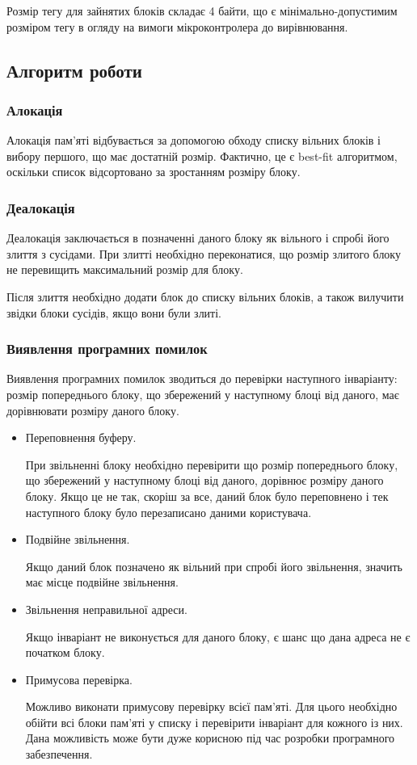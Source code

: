\documentclass[oneside,14pt,a4paper,final]{myextreport}
\begin{document}
Розмір тегу для зайнятих блоків складає 4 байти, що є мінімально-допустимим розміром тегу в огляду на вимоги мікроконтролера до вирівнювання.

\subsection{Алгоритм роботи}

\subsubsection{Алокація}
Алокація пам'яті відбувається за допомогою обходу списку вільних блоків і вибору першого, що має достатній розмір. Фактично, це є best-fit алгоритмом, оскільки список відсортовано за зростанням розміру блоку.

\subsubsection{Деалокація}
Деалокація заключається в позначенні даного блоку як вільного і спробі його злиття з сусідами. При злитті необхідно переконатися, що розмір злитого блоку не перевищить максимальний розмір для блоку.

Після злиття необхідно додати блок до списку вільних блоків, а також вилучити звідки блоки сусідів, якщо вони були злиті.

\subsubsection{Виявлення програмних помилок}
Виявлення програмних помилок зводиться до перевірки наступного інваріанту: розмір попереднього блоку, що збережений у наступному блоці від даного, має дорівнювати розміру даного блоку.

\begin{itemize}
\item Переповнення буферу.

  При звільненні блоку необхідно перевірити що розмір попереднього блоку, що збережений у наступному блоці від даного, дорівнює розміру даного блоку. Якщо це не так, скоріш за все, даний блок було переповнено і тек наступного блоку було перезаписано даними користувача.

\item Подвійне звільнення.

  Якщо даний блок позначено як вільний при спробі його звільнення, значить має місце подвійне звільнення.

\item Звільнення неправильної адреси.

  Якщо інваріант не виконується для даного блоку, є шанс що дана адреса не є початком блоку.

\item Примусова перевірка.

  Можливо виконати примусову перевірку всієї пам'яті. Для цього необхідно обійти всі блоки пам'яті у списку і перевірити інваріант для кожного із них. Дана можливість може бути дуже корисною під час розробки програмного забезпечення.
\end{itemize}
\end{document}
